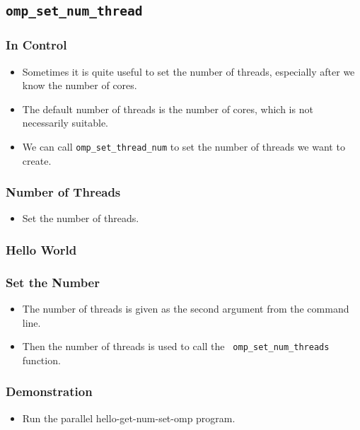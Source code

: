 \documentclass{beamer}
\begin{document}
\subsection{\tt omp\_set\_num\_thread}

\begin{frame}
\frametitle{In Control}
\begin{itemize}
\item Sometimes it is quite useful to set the number of threads,
  especially after we know the number of cores.
\item The default number of threads is the number of cores, which is
  not necessarily suitable.
\item We can call {\tt omp\_set\_thread\_num} to set the number of
  threads we want to create.
\end{itemize}
\end{frame}


\begin{frame}
\frametitle{Number of Threads}
\begin{itemize}
\item Set the number of threads.
\end{itemize}
\end{frame}


\begin{frame}
\frametitle{Hello World}
\end{frame}

\begin{frame}
\frametitle{Set the Number}
\begin{itemize}
\item The number of threads is given as the second argument from the
  command line.
\item Then the number of threads is used to call the {\tt
  omp\_set\_num\_threads} function.
\end{itemize}
\end{frame}

\begin{frame}
\frametitle{Demonstration}
\begin{itemize}
\item Run the parallel hello-get-num-set-omp program.
\end{itemize}
\end{frame}
\end{document}
